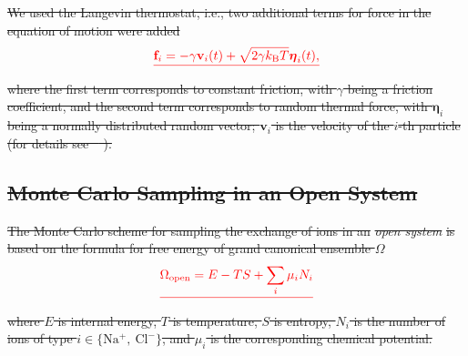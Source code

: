 \documentclass[gels,article,accept,pdftex,moreauthors]{Definitions/mdpi}
\newcommand{\ie}{{i.e.,} }
\newcommand{\kT}{k_\mathrm{B}T}
\newcommand{\cl}{\mathrm{Cl^-}}
\newcommand{\na}{\mathrm{Na^+}}
\providecommand{\DIFdel}[1]{{\protect\color{red}\sout{#1}}}                      %
\begin{document}
\DIFdel{We used the Langevin thermostat, \ie two additional terms for force in the equation of motion were added
}\begin{displaymath}
\DIFdel{\mathbf{f}_i =  -\gamma \mathbf{v}_i(t)+\sqrt{2\gamma \kT }\boldsymbol{\eta}_i(t),
}\end{displaymath}%
\DIFdel{where the first term corresponds to constant friction, with $\gamma$ being a friction coefficient,
 and the second term corresponds to random thermal force, with $\boldsymbol{\eta}_i$ being a normally distributed random vector; $\mathbf{v}_i$ is the velocity of the $i$-th particle (for details see \mbox{%
\cite{Grest1986}}\hspace{0pt}%
).
}%

\subsection{\DIFdel{Monte Carlo Sampling in an Open System}}
\addtocounter{subsection}{-1}%
\DIFdel{The Monte Carlo scheme for sampling the exchange of ions in an }\emph{\DIFdel{open system}} %
\DIFdel{is based on the formula for free energy of grand canonical ensemble $\Omega$
}\begin{displaymath}
    \DIFdel{\Omega_{\mathrm{open}}=E-TS+\sum_i\mu_i N_i%
}\end{displaymath}%
\DIFdel{where $E$ is internal energy, $T$ is temperature, $S$ is entropy, $N_i$ is the number of ions of type $i\in\{\na,\ \cl\}$, and $\mu_i$ is the corresponding chemical potential.
}%
\end{document}
